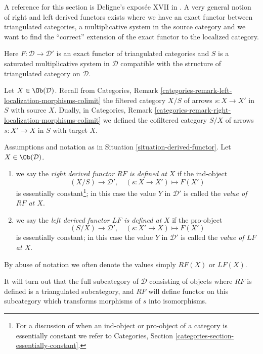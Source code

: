 \noindent
A reference for this section is Deligne's expos\'ee XVII in \cite{SGA4}.
A very general notion of right and left derived functors exists where
we have an exact functor between triangulated categories, a multiplicative
system in the source category and we want to find the ``correct'' extension
of the exact functor to the localized category.

\begin{situation}
\label{situation-derived-functor}
Here $F : \mathcal{D} \to \mathcal{D}'$ is an exact functor of triangulated
categories and $S$ is a saturated multiplicative
system in $\mathcal{D}$ compatible with the structure
of triangulated category on $\mathcal{D}$.
\end{situation}

\noindent
Let $X \in \Ob(\mathcal{D})$. Recall from
Categories, Remark \ref{categories-remark-left-localization-morphisms-colimit}
the filtered category $X/S$ of arrows $s : X \to X'$ in $S$ with source $X$.
Dually, in
Categories, Remark \ref{categories-remark-right-localization-morphisms-colimit}
we defined the cofiltered category $S/X$ of arrows $s : X' \to X$ in $S$
with target $X$.

\begin{definition}
\label{definition-right-derived-functor-defined}
Assumptions and notation as in
Situation \ref{situation-derived-functor}.
Let $X \in \Ob(\mathcal{D})$.
\begin{enumerate}
\item we say the {\it right derived functor $RF$ is defined at}
$X$ if the ind-object
$$
(X/S) \longrightarrow \mathcal{D}', \quad
(s : X \to X') \longmapsto F(X')
$$
is essentially constant\footnote{For a discussion of when an ind-object
or pro-object of a category is essentially constant we refer to
Categories, Section \ref{categories-section-essentially-constant}.};
in this case the value
$Y$ in $\mathcal{D}'$ is called the {\it value of $RF$ at $X$}.
\item we say the {\it left derived functor $LF$ is defined at} $X$
if the pro-object
$$
(S/X) \longrightarrow \mathcal{D}', \quad
(s: X' \to X) \longmapsto F(X')
$$
is essentially constant; in this case the value $Y$ in $\mathcal{D}'$
is called the {\it value of $LF$ at $X$}.
\end{enumerate}
By abuse of notation we often denote the values simply
$RF(X)$ or $LF(X)$.
\end{definition}

\noindent
It will turn out that the full subcategory of $\mathcal{D}$ consisting
of objects where $RF$ is defined is a triangulated subcategory, and
$RF$ will define functor on this subcategory which transforms morphisms
of $s$ into isomorphisms.

